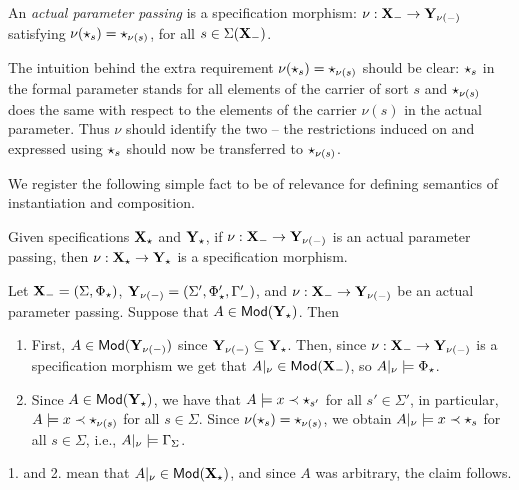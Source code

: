 \begin{definition}
An {\em actual parameter passing} is a specification morphism:
$\nu:{\bf X_-} \to {\bf Y_{\nu(-)}}$ satisfying
$\nu(\star_s) = \star_{\nu(s)}$, for all $s \in \Sigma({\bf X_-})$.
\end{definition}
The intuition behind the extra requirement $\nu(\star_s) = \star_{\nu(s)}$
should be clear: $\star_s$ in the formal parameter stands for all elements of
the carrier of sort $s$ and  $\star_{\nu(s)}$ does the same with respect to the
elements of the carrier $\nu(s)$ in the actual parameter. Thus $\nu$ should
identify the two --  the restrictions induced on and expressed using
$\star_s$ should now be transferred to $\star_{\nu(s)}$.

We register the following simple fact to be of relevance for defining
semantics of instantiation and composition.

\begin{lemma}\label{le:id-^-1}
Given specifications ${\bf X}_\star$ and ${\bf Y}_\star$, 
if $\nu:{\bf X_-}\to {\bf Y_{\nu(-)}}$ is an actual parameter passing,
then $\nu:{\bf X}_\star\to {\bf Y}_\star$ is a specification morphism.
\end{lemma}
\begin{PROOF}
Let ${\bf X_-}=(\Sigma,\Phi_\star)$,
${\bf Y_{\nu(-)}}=(\Sigma',\Phi'_\star,\Gamma'_-)$, and $\nu:{\bf X_-}\to {\bf Y_{\nu(-)}}$ be an actual parameter passing.
Suppose that $A \in {\sf {Mod}}({\bf Y_\star})$. Then
\begin{enumerate}\MyLPar
\item First, $A\in {\sf {Mod}}({\bf Y_{\nu(-)}})$ since
${\bf Y_{\nu(-)}}\subseteq {\bf Y_\star}$. Then, since 
$\nu:{\bf X_-}\to {\bf Y_{\nu(-)}}$ is
	a specification morphism we get that $A|_\nu \in
	{\sf {Mod}}({\bf X_-})$, so $A|_\nu \models \Phi_\star$.

\item Since $A\in{\sf {Mod}}({\bf Y}_\star)$, we have that $A\models x\prec
\star_{s'}$ for all $s'\in\Sigma'$, in particular, $A \models x
	\prec \star_{\nu(s)}$ for all $s \in \Sigma$. 
Since $\nu(\star_s) = \star_{\nu(s)}$,  we obtain
	$A|_\nu \models x \prec \star_s$ for all $s \in \Sigma$,
	i.e., $A|_\nu \models \Gamma_\Sigma$.  
\end{enumerate} 
1. and 2. mean that $A|_\nu \in {\sf {Mod}}({\bf X_\star})$, and since $A$ was
arbitrary, the claim follows. 
\end{PROOF}

